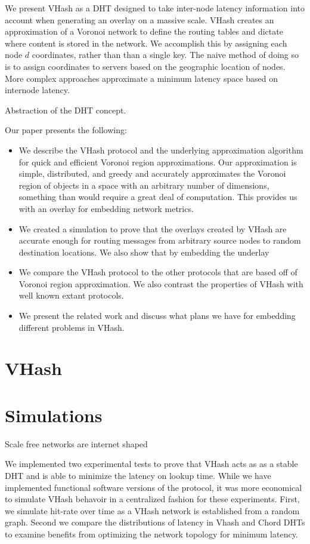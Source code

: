\documentclass{IEEEtran}
\begin{document}
We present VHash as a DHT designed to take inter-node latency information into account when generating an overlay on a massive scale.  VHash creates an approximation of a Voronoi network to define the routing tables and dictate where content is stored in the network.  We accomplish this by assigning each node $d$ coordinates, rather than than a single key.  The naive method of doing so is to assign coordinates to servers based on the geographic location of nodes. More complex approaches approximate a minimum latency space based on internode latency.

Abstraction of the DHT concept.

Our paper presents the following:
\begin{itemize}
	\item We describe the VHash protocol and the underlying approximation algorithm for quick and efficient Voronoi region approximations.   Our approximation is simple, distributed, and greedy and accurately approximates the Voronoi region of objects in a space with an arbitrary number of dimensions, something than would require a great deal of computation.  This provides us with an overlay for embedding network metrics.
	\item We created a simulation to prove that the overlays created by VHash are accurate enough for routing messages from arbitrary source nodes to random destination locations.  We also show that by embedding the underlay 
	\item We compare the VHash protocol to the other protocols that are based off of Voronoi region approximation.  We also contrast the properties of VHash with well known extant protocols.
	\item We present the related work and discuss what plans we  have for embedding different problems in VHash.
\end{itemize}


\section{VHash}



\section{Simulations}
Scale free networks are internet shaped\cite{cohen2000resilience}

We implemented two experimental tests to prove that VHash acts as as a stable DHT and is able to minimize the latency on lookup time.
While we have implemented functional software versions of the protocol, it was more economical to simulate VHash behavoir in a centralized fashion for these experiments.
First, we simulate hit-rate over time as a VHash network is established from a random graph.
Second we compare the distributions of latency in Vhash and Chord DHTs to examine benefits from optimizing the network topology for minimum latency.
\end{document}
